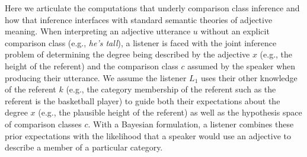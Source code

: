 \documentclass[doc]{apa6}
\begin{document}
Here we articulate the computations that underly comparison class inference and how that inference interfaces with standard semantic theories of adjective meaning.
When interpreting an adjective utterance $u$ without an explicit comparison class (e.g., \emph{he's tall}), a listener is faced with the joint inference problem of determining the degree being described by the adjective $x$ (e.g., the height of the referent) and the comparison class $c$ assumed by the speaker when producing their utterance.
We assume the listener $L_1$  uses their other knowledge of the referent $k$ (e.g., the category membership of the referent such as the referent is the basketball player) to guide both their expectations about the degree $x$ (e.g., the plausible height of the referent) as well as the hypothesis space of comparison classes $c$.
With a Bayesian formulation, a listener combines these prior expectations with the likelihood that a speaker would use an adjective to describe a member of a particular category.





\end{document}
